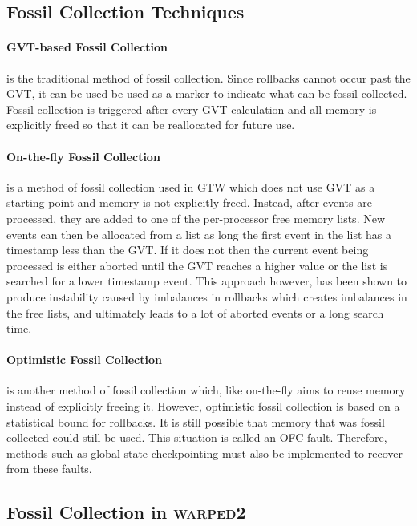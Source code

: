 \documentclass[11pt]{book}
\begin{document}
\subsection{Fossil Collection Techniques}

\paragraph{GVT-based Fossil Collection} is the traditional method of fossil collection.
Since rollbacks cannot occur past the GVT, it can be used be used as a marker to indicate
what can be fossil collected.  Fossil collection is triggered after every GVT calculation
and all memory is explicitly freed so that it can be reallocated for future use.

\paragraph{On-the-fly Fossil Collection} is a method of fossil collection used in GTW
which does not use GVT as a starting point and memory is not explicitly freed.  Instead, after
events are processed, they are added to one of the per-processor free memory lists.  New events
can then be allocated from a list as long the first event in the list has a timestamp less than
the GVT.  If it does not then the current event being processed is either aborted until the GVT
reaches a higher value or the list is searched for a lower timestamp event.  This approach however,
has been shown to produce instability caused by imbalances in rollbacks which creates imbalances
in the free lists, and ultimately leads to a lot of aborted events or a long search time.

\paragraph{Optimistic Fossil Collection} is another method of fossil collection which, like
on-the-fly aims to reuse memory instead of explicitly freeing it.  However, optimistic fossil
collection is based on a statistical bound for rollbacks.  It is still possible that memory that
was fossil collected could still be used.  This situation is called an OFC fault.  Therefore,
methods such as global state checkpointing must also be implemented to recover from these faults.

\subsection{Fossil Collection in \textsc{warped2}}
\end{document}
